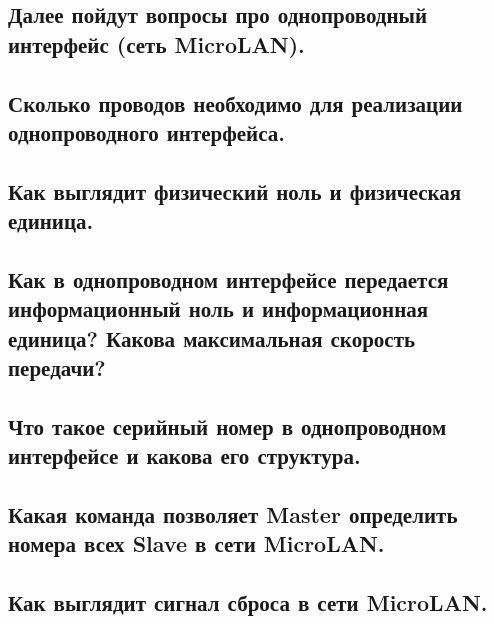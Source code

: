 \subsection{Далее пойдут вопросы про однопроводный интерфейс (сеть MicroLAN).}


\subsection{Сколько проводов необходимо для реализации однопроводного интерфейса.}


\subsection{Как выглядит физический ноль и физическая единица.}


\subsection{Как в однопроводном интерфейсе передается информационный ноль и информационная единица? Какова максимальная скорость  передачи?}


\subsection{Что такое серийный номер в однопроводном интерфейсе и какова его структура.}


\subsection{Какая команда позволяет Master определить номера всех Slave в сети MicroLAN.}


\subsection{Как выглядит сигнал сброса в сети MicroLAN.}


